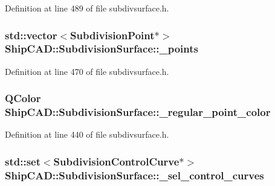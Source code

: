 Definition at line 489 of file subdivsurface.\+h.

\subsubsection[{\texorpdfstring{\+\_\+points}{_points}}]{\setlength{\rightskip}{0pt plus 5cm}std\+::vector$<${\bf Subdivision\+Point}$\ast$$>$ Ship\+C\+A\+D\+::\+Subdivision\+Surface\+::\+\_\+points\hspace{0.3cm}{\ttfamily [protected]}}\hypertarget{classShipCAD_1_1SubdivisionSurface_ab03b7f4694a63eeb3ebb831484cb1bff}{}\label{classShipCAD_1_1SubdivisionSurface_ab03b7f4694a63eeb3ebb831484cb1bff}


Definition at line 470 of file subdivsurface.\+h.

\subsubsection[{\texorpdfstring{\+\_\+regular\+\_\+point\+\_\+color}{_regular_point_color}}]{\setlength{\rightskip}{0pt plus 5cm}Q\+Color Ship\+C\+A\+D\+::\+Subdivision\+Surface\+::\+\_\+regular\+\_\+point\+\_\+color\hspace{0.3cm}{\ttfamily [protected]}}\hypertarget{classShipCAD_1_1SubdivisionSurface_afee1585e376c34aa9b3be47f3a174cdb}{}\label{classShipCAD_1_1SubdivisionSurface_afee1585e376c34aa9b3be47f3a174cdb}


Definition at line 440 of file subdivsurface.\+h.

\subsubsection[{\texorpdfstring{\+\_\+sel\+\_\+control\+\_\+curves}{_sel_control_curves}}]{\setlength{\rightskip}{0pt plus 5cm}std\+::set$<${\bf Subdivision\+Control\+Curve}$\ast$$>$ Ship\+C\+A\+D\+::\+Subdivision\+Surface\+::\+\_\+sel\+\_\+control\+\_\+curves\hspace{0.3cm}{\ttfamily [protected]}}\hypertarget{classShipCAD_1_1SubdivisionSurface_abeb17606808d7eddb3917735bc8ac2bd}{}\label{classShipCAD_1_1SubdivisionSurface_abeb17606808d7eddb3917735bc8ac2bd}


